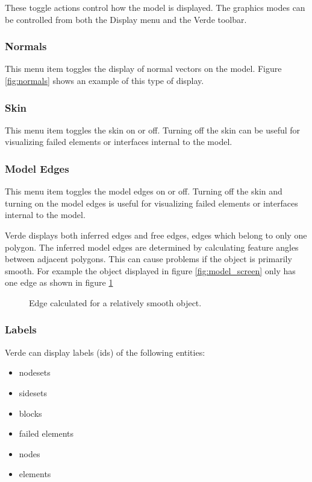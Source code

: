 \documentclass[10pt]{report}
\begin{document}
These toggle actions control how the model is displayed.  The graphics 
modes can be controlled from both the Display menu and the Verde 
toolbar.  

\subsubsection{Normals}
\label{normals}
This menu item toggles the display of normal vectors on the model.  
Figure \ref{fig:normals} shows an example of this type of display.

\subsubsection{Skin}
\label{skin}
This menu item toggles the skin on or off.  Turning off the skin can 
be useful for visualizing failed elements or interfaces internal to
the model.

\subsubsection{Model Edges}
\label{edges}
This menu item toggles the model edges on or off.  Turning off the skin and
turning on the model edges 
is useful for visualizing failed elements or interfaces internal to
the model.

Verde displays both inferred edges and free edges, edges which belong
to only one polygon.
The inferred model edges are determined by calculating feature 
angles between adjacent
polygons.  This can cause problems if the object is primarily smooth.
For example the object displayed in figure \ref{fig:model_screen} only
has one edge as shown in figure \ref{fig:edge_only}

\htmlrule
\begin{figure}[tbh]
  \begin{center}
              {}
    \caption{Edge calculated for a relatively smooth object.}
    \label{fig:edge_only}
  \end{center}
\end{figure}     
\htmlrule

\subsubsection{Labels}
\label{labels}
Verde can display labels (ids) of the following entities:

\begin{itemize}
\item nodesets
\item sidesets 
\item blocks
\item failed elements
\item nodes
\item elements
\end{itemize}
\end{document}
